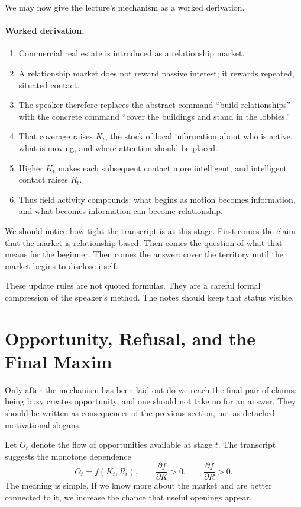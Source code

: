 We may now give the lecture's mechanism as a worked derivation.

\paragraph{Worked derivation.}
\begin{enumerate}
\item Commercial real estate is introduced as a relationship market.
\item A relationship market does not reward passive interest; it rewards repeated, situated contact.
\item The speaker therefore replaces the abstract command ``build relationships'' with the concrete command ``cover the buildings and stand in the lobbies.''
\item That coverage raises \(K_t\), the stock of local information about who is active, what is moving, and where attention should be placed.
\item Higher \(K_t\) makes each subsequent contact more intelligent, and intelligent contact raises \(R_t\).
\item Thus field activity compounds: what begins as motion becomes information, and what becomes information can become relationship.
\end{enumerate}

We should notice how tight the transcript is at this stage. First comes the claim that the market is relationship-based. Then comes the question of what that means for the beginner. Then comes the answer: cover the territory until the market begins to disclose itself.

\begin{remark}
These update rules are not quoted formulas. They are a careful formal compression of the speaker's method. The notes should keep that status visible.
\end{remark}

\section{Opportunity, Refusal, and the Final Maxim}

Only after the mechanism has been laid out do we reach the final pair of claims: being busy creates opportunity, and one should not take no for an answer. They should be written as consequences of the previous section, not as detached motivational slogans.

Let \(O_t\) denote the flow of opportunities available at stage \(t\). The transcript suggests the monotone dependence
\begin{equation}
O_t = f(K_t,R_t), \qquad \frac{\partial f}{\partial K} > 0, \qquad \frac{\partial f}{\partial R} > 0.
\end{equation}
The meaning is simple. If we know more about the market and are better connected to it, we increase the chance that useful openings appear.

